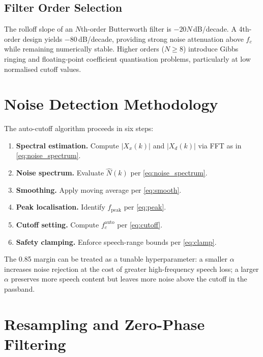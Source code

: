 \documentclass[conference]{IEEEtran}
\begin{document}
\subsection{Filter Order Selection}

The rolloff slope of an $N$th-order Butterworth filter is $-20N$\,dB/decade.
A 4th-order design yields $-80$\,dB/decade, providing strong noise
attenuation above $f_c$ while remaining numerically stable. Higher orders
($N \geq 8$) introduce Gibbs ringing and floating-point coefficient
quantisation problems, particularly at low normalised cutoff values.

\section{Noise Detection Methodology}

The auto-cutoff algorithm proceeds in six steps:

\begin{enumerate}
  \item \textbf{Spectral estimation.} Compute $|X_x(k)|$ and $|X_d(k)|$
        via FFT as in \eqref{eq:noise_spectrum}.
  \item \textbf{Noise spectrum.} Evaluate $\hat{N}(k)$ per
        \eqref{eq:noise_spectrum}.
  \item \textbf{Smoothing.} Apply moving average per \eqref{eq:smooth}.
  \item \textbf{Peak localisation.} Identify $f_{\text{peak}}$ per
        \eqref{eq:peak}.
  \item \textbf{Cutoff setting.} Compute $f_c^{\text{auto}}$ per
        \eqref{eq:cutoff}.
  \item \textbf{Safety clamping.} Enforce speech-range bounds per
        \eqref{eq:clamp}.
\end{enumerate}

The 0.85 margin can be treated as a tunable hyperparameter: a smaller
$\alpha$ increases noise rejection at the cost of greater high-frequency
speech loss; a larger $\alpha$ preserves more speech content but leaves more
noise above the cutoff in the passband.

\section{Resampling and Zero-Phase Filtering}
\end{document}
